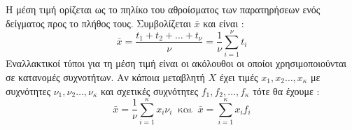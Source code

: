 Η μέση τιμή ορίζεται ως το πηλίκο του αθροίσματος των παρατηρήσεων ενός δείγματος προς το πλήθος τους. Συμβολίζεται $ \bar{x} $ και είναι :
\[ \bar{x}=\frac{t_1+t_2+\ldots+t_\nu}{\nu}=\frac{1}{\nu}\sum_{i=1}^{\nu}{t_i} \]
Εναλλακτικοί τύποι για τη μέση τιμή είναι οι ακόλουθοι οι οποίοι χρησιμοποιούνται σε κατανομές συχνοτήτων. Αν κάποια μεταβλητή $ X $ έχει τιμές $ x_1,x_2\ldots,x_\kappa $ με συχνότητες $ \nu_1,\nu_2\ldots,\nu_\kappa $ και σχετικές συχνότητες $ f_1,f_2,\ldots,f_\kappa $ τότε θα έχουμε :
\[ \bar{x}=\frac{1}{\nu}\sum_{i=1}^{\kappa}{x_i\nu_i}\ \textrm{ και }\ \bar{x}=\sum_{i=1}^{\kappa}{x_if_i} \]
